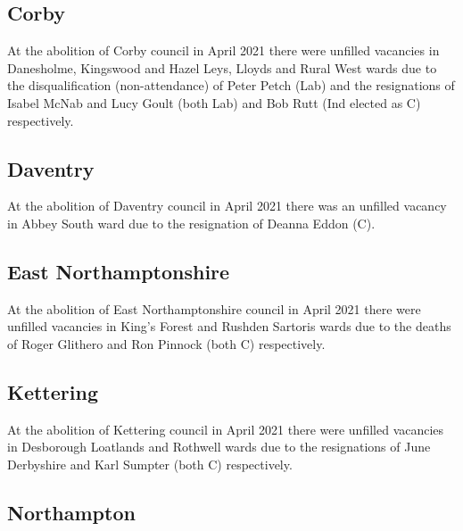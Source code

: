 \documentclass[a4paper,openany]{book}
\begin{document}
\begin{resultsiii}
\subsection*{Corby}

At the abolition of Corby council in April 2021 there were un{fi}lled vacancies in Danesholme, Kingswood and Hazel Leys, Lloyds and Rural West wards due to the disquali{fi}cation (non-attendance) of Peter Petch (Lab) and the resignations of Isabel McNab and Lucy Goult (both Lab) and Bob Rutt (Ind elected as C) respectively.

\subsection*{Daventry}

At the abolition of Daventry council in April 2021 there was an unfilled vacancy in Abbey South ward due to the resignation of Deanna Eddon (C).

\subsection*{East Northamptonshire}

At the abolition of East Northamptonshire council in April 2021 there were unfilled vacancies in King's Forest and Rushden Sartoris wards due to the deaths of Roger Glithero and Ron Pinnock (both C) respectively.

\subsection*{Kettering}

At the abolition of Kettering council in April 2021 there were unfilled vacancies in Desborough Loatlands and Rothwell wards due to the resignations of June Derbyshire and Karl Sumpter (both C) respectively.

\subsection*{Northampton}


\end{resultsiii}
\end{document}
